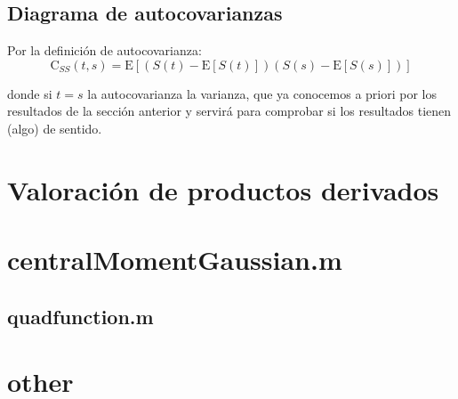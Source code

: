 \documentclass[a4paper,11pt]{article}
\begin{document}
\subsection{Diagrama de autocovarianzas}

Por la definici\'on de autocovarianza:\\

\begin{equation*}
   \mathrm{C}_{SS}(t,s) = \mathrm{E}[(S(t)-\mathrm{E}[S(t)])(S(s)-\mathrm{E}[S(s)])]
\end{equation*}

donde si $t = s$ la autocovarianza la varianza, que ya conocemos a priori por los
resultados de la secci\'on anterior y servir\'a para comprobar si los resultados
tienen (algo) de sentido.


\pagebreak
\section{Valoraci\'on de productos derivados}

\pagebreak
\appendix
  \section{centralMomentGaussian.m}

  
  \subsection{quadfunction.m}
  

\pagebreak
\section{other}
\end{document}
